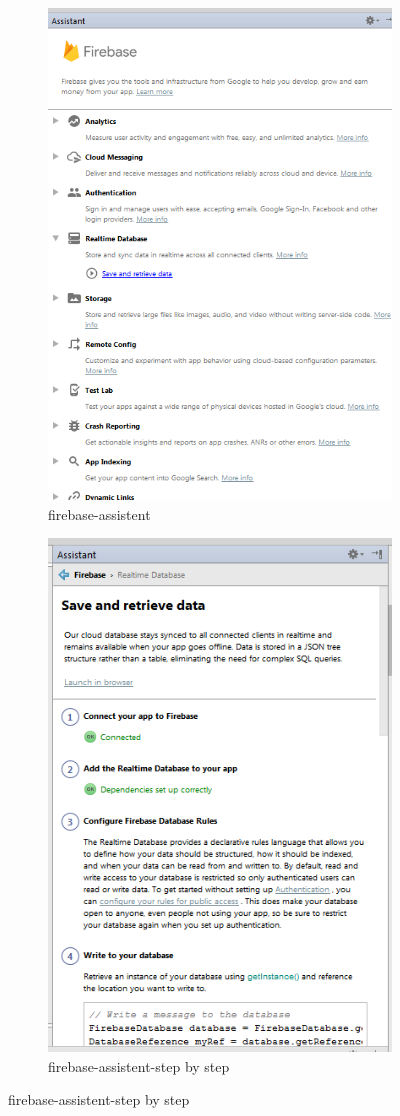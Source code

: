 \begin{figure}[h]
	\begin{subfigure}[b]{0.5\textwidth}
	\centering
	\includegraphics[width=0.7\linewidth]{images/assistent}
	\caption{firebase-assistent}
	\label{fig:assistent}
\end{subfigure}%
\begin{subfigure}[b]{0.5\textwidth}
		\centering
	\includegraphics[width=0.7\linewidth]{images/connectedfirbase}
	\caption{firebase-assistent-step by step}
	\label{fig:connectedfirbase}
\end{subfigure}%
	
\end{figure}
